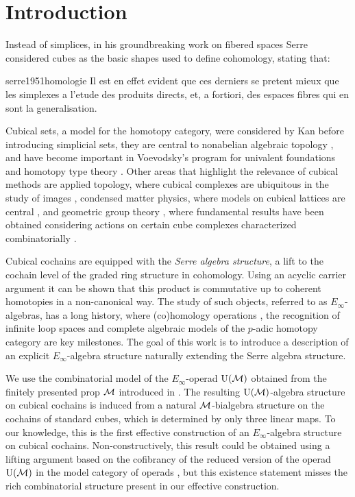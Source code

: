 
\section{Introduction} \label{s:introduction}

Instead of simplices, in his groundbreaking work on fibered spaces Serre considered cubes as the basic shapes used to define cohomology, stating that:
\begin{displaycquote}[p.431]{serre1951homologie}
	Il est en effet evident que ces derniers se pretent mieux que les simplexes a l'etude des produits directs, et, a fortiori, des espaces fibres qui en sont la generalisation.
\end{displaycquote}
Cubical sets, a model for the homotopy category, were considered by Kan \cite{kan1955abstract, kan1956abstract} before introducing simplicial sets, they are central to nonabelian algebraic topology \cite{brown2011nonabelian}, and have become important in Voevodsky's program for univalent foundations and homotopy type theory \cite{kapulkin2020straightening, mortberg2017cubical}.
Other areas that highlight the relevance of cubical methods are applied topology, where cubical complexes are ubiquitous in the study of images \cite{tomasz2004computational}, condensed matter physics, where models on cubical lattices are central \cite{baxter1985exactlysolved}, and geometric group theory \cite{gromov1987hyperbolic}, where fundamental results have been obtained considering actions on certain cube complexes characterized combinatorially \cite{agol2013haken}.

Cubical cochains are equipped with the \textit{Serre algebra structure}, a lift to the cochain level of the graded ring structure in cohomology.
Using an acyclic carrier argument it can be shown that this product is commutative up to coherent homotopies in a non-canonical way.
The study of such objects, referred to as $E_\infty$-algebras, has a long history, where (co)homology operations \cite{steenrod1962cohomology, may1970general}, the recognition of infinite loop spaces \cite{boardman1973homotopy, may1972geometry} and complete algebraic models of the $p$-adic homotopy category \cite{mandell2001padic} are key milestones.
The goal of this work is to introduce a description of an explicit $E_\infty$-algebra structure naturally extending the Serre algebra structure.

We use the combinatorial model of the $E_\infty$-operad ${\operatorname{U}(\mathcal{M})}$ obtained from the finitely presented prop $\mathcal{M}$ introduced in \cite{medina2020prop1}.
The resulting ${\operatorname{U}(\mathcal{M})}$-algebra structure on cubical cochains is induced from a natural $\mathcal{M}$-bialgebra structure on the cochains of standard cubes, which is determined by only three linear maps.
To our knowledge, this is the first effective construction of an $E_\infty$-algebra structure on cubical cochains.
Non-constructively, this result could be obtained using a lifting argument based on the cofibrancy of the reduced version of the operad ${\operatorname{U}(\mathcal{M})}$ in the model category of operads \cite{hinich1997homological, berger2003modelcategory}, but this existence statement misses the rich combinatorial structure present in our effective construction.

